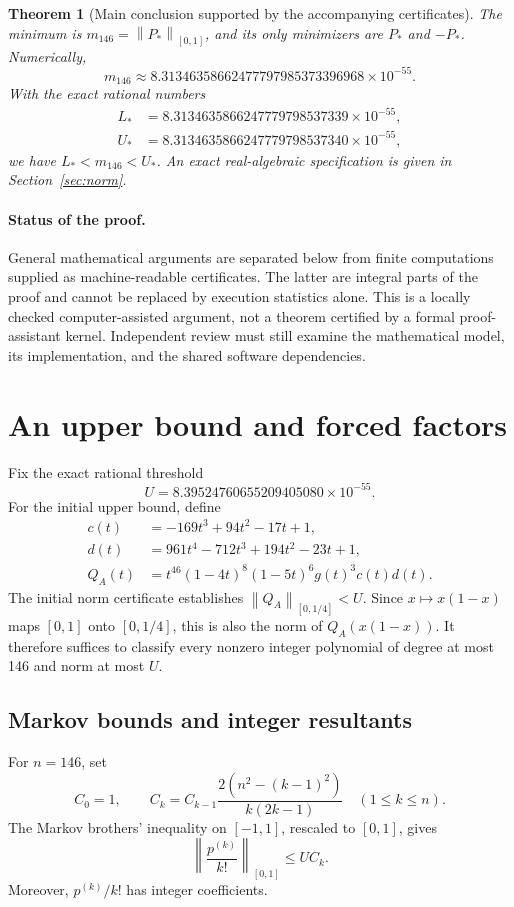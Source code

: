 \documentclass[11pt,a4paper]{article}
\newtheorem{theorem}{Theorem}[section]
\newcommand{\norm}[1]{\left\lVert#1\right\rVert}
\begin{document}
\begin{theorem}[Main conclusion supported by the accompanying certificates]\label{thm:main}
The minimum is $m_{146}=\norm{P_*}_{[0,1]}$, and its only minimizers are $P_*$ and $-P_*$. Numerically,
\[
m_{146}\approx8.31346358662477797985373396968\times10^{-55}.
\]
With the exact rational numbers
\begin{align*}
L_*&=8.3134635866247779798537339\times10^{-55},\\
U_*&=8.3134635866247779798537340\times10^{-55},
\end{align*}
we have $L_*<m_{146}<U_*$. An exact real-algebraic specification is given in Section~\ref{sec:norm}.
\end{theorem}

\paragraph{Status of the proof.}
General mathematical arguments are separated below from finite computations supplied as machine-readable certificates. The latter are integral parts of the proof and cannot be replaced by execution statistics alone. This is a locally checked computer-assisted argument, not a theorem certified by a formal proof-assistant kernel. Independent review must still examine the mathematical model, its implementation, and the shared software dependencies.

\section{An upper bound and forced factors}
Fix the exact rational threshold
\begin{equation}\label{eq:U}
U=8.39524760655209405080\times10^{-55}.
\end{equation}
For the initial upper bound, define
\begin{align*}
c(t)&=-169t^3+94t^2-17t+1,\\
d(t)&=961t^4-712t^3+194t^2-23t+1,\\
Q_A(t)&=t^{46}(1-4t)^8(1-5t)^6g(t)^3c(t)d(t).
\end{align*}
The initial norm certificate establishes $\norm{Q_A}_{[0,1/4]}<U$. Since $x\mapsto x(1-x)$ maps $[0,1]$ onto $[0,1/4]$, this is also the norm of $Q_A(x(1-x))$. It therefore suffices to classify every nonzero integer polynomial of degree at most 146 and norm at most $U$.

\subsection{Markov bounds and integer resultants}
For $n=146$, set
\[
C_0=1,\qquad C_k=C_{k-1}\frac{2(n^2-(k-1)^2)}{k(2k-1)}\quad(1\le k\le n).
\]
The Markov brothers' inequality on $[-1,1]$, rescaled to $[0,1]$, gives
\begin{equation}\label{eq:markov}
\left\lVert\frac{p^{(k)}}{k!}\right\rVert_{[0,1]}\le UC_k.
\end{equation}
Moreover, $p^{(k)}/k!$ has integer coefficients.
\end{document}
